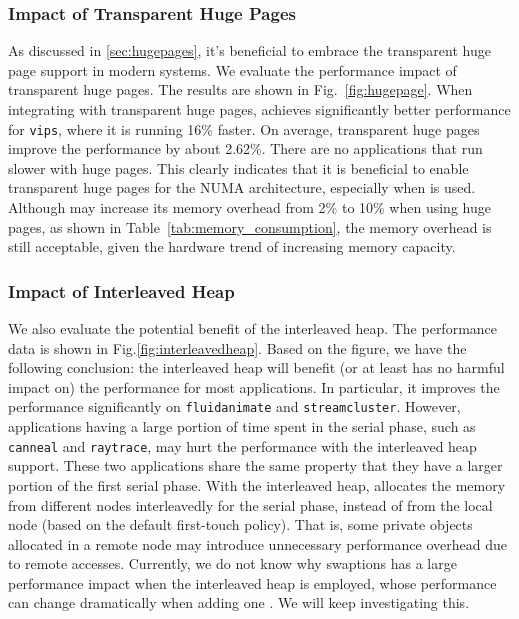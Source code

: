 
\subsubsection{Impact of Transparent Huge Pages}

As discussed in \ref{sec:hugepages}, it's beneficial to embrace the transparent huge page support in modern systems. We evaluate the performance impact of transparent huge pages. The results are shown in Fig.~\ref{fig:hugepage}. When integrating with transparent huge pages, \NM{} achieves significantly better performance for \texttt{vips}, where it is running 16\% faster. On average, transparent huge pages improve the performance by about 2.62\%. There are no applications that run slower with huge pages. This clearly indicates that it is beneficial to enable transparent huge pages for the NUMA architecture, especially when \NM{} is used. 
Although \NM{} may increase its memory overhead from 2\% to 10\% when using huge pages, as shown in Table~\ref{tab:memory_consumption}, the memory overhead is still acceptable, given the hardware trend of increasing memory capacity.  


\subsubsection{Impact of Interleaved Heap} 
\label{sec:interleavedheap}

We also evaluate the potential benefit of the interleaved heap. The performance data is shown in Fig.\ref{fig:interleavedheap}. 
Based on the figure, we have the following conclusion: the interleaved heap will benefit (or at least has no harmful impact on) the performance for most applications. In particular, it improves the performance significantly on \texttt{fluidanimate} and \texttt{streamcluster}.  However, applications having a large portion of time spent in the serial phase, such as \texttt{canneal} and \texttt{raytrace}, may hurt the performance with the interleaved heap support. These two applications share the same property that they have a larger portion of the first serial phase. With the interleaved heap, \NM{} allocates the memory from different nodes interleavedly for the serial phase, instead of from the local node (based on the default first-touch policy). That is, some private objects allocated in a remote node may introduce unnecessary performance overhead due to remote accesses. Currently, we do not know why swaptions has a large  performance impact when the interleaved heap is employed, whose performance can change dramatically when adding one . We will keep investigating this. 

